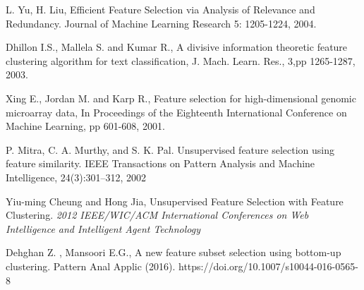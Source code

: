 \documentclass[a4paper,11pt]{article}
\begin{document}
\begin{thebibliography}{}
L. Yu, H. Liu, Efficient Feature Selection via Analysis
of Relevance and Redundancy. Journal of Machine
Learning Research 5: 1205-1224, 2004.

Dhillon I.S., Mallela S. and Kumar R., A divisive information theoretic feature clustering algorithm for text classification, J. Mach. Learn. Res., 3,pp 1265-1287, 2003.

Xing E., Jordan M. and Karp R., Feature selection for high-dimensional genomic microarray data, In Proceedings of the Eighteenth International Conference on Machine Learning, pp 601-608, 2001.

P. Mitra, C. A. Murthy, and S. K. Pal. Unsupervised feature selection using feature similarity. IEEE Transactions on Pattern Analysis and Machine Intelligence, 24(3):301–312, 2002

Yiu-ming Cheung and Hong Jia, Unsupervised Feature Selection with Feature Clustering. \textit{2012 IEEE/WIC/ACM International Conferences on Web Intelligence and Intelligent Agent Technology}

Dehghan Z. , Mansoori E.G., A new feature subset selection using bottom-up clustering. Pattern Anal Applic (2016). https://doi.org/10.1007/s10044-016-0565-8
\end{thebibliography}
\end{document}
